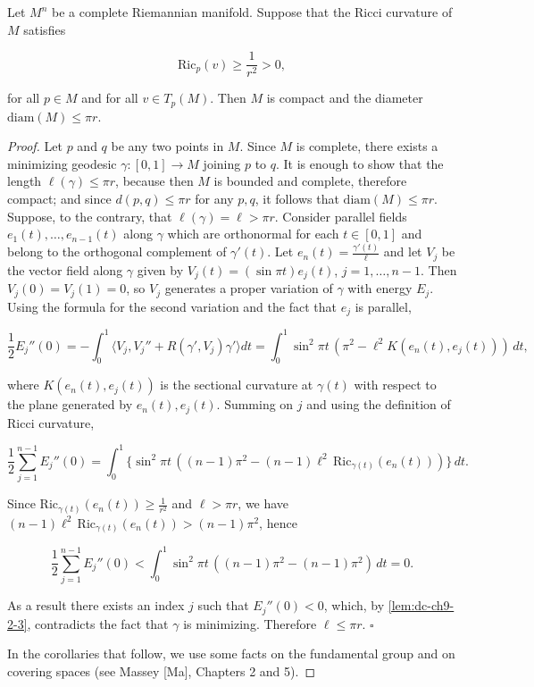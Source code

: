 \begin{theorem}
  \label{thm:dc-ch9-3-1}
  Let $M^n$ be a complete Riemannian manifold. Suppose that the Ricci curvature of
  $M$ satisfies
  
  $$
  \mathrm{Ric}_p(v)\ge\frac{1}{r^2}>0,
  $$
  
  for all $p\in M$ and for all $v\in T_p(M)$. Then $M$ is compact and the diameter
  $\mathrm{diam}(M)\le\pi r$.
\end{theorem}
\begin{proof}
  Let $p$ and $q$ be any two points in $M$. Since $M$ is complete, there
  exists a minimizing geodesic $\gamma:[0,1]\to M$ joining $p$ to $q$. It is enough
  to show that the length $\ell(\gamma)\le\pi r$, because then $M$ is bounded and
  complete, therefore compact; and since $d(p,q)\le\pi r$ for any $p,q$, it follows
  that $\mathrm{diam}(M)\le\pi r$. Suppose, to the contrary, that
  $\ell(\gamma)=\ell>\pi r$. Consider parallel fields $e_1(t),\dots,e_{n-1}(t)$ along
  $\gamma$ which are orthonormal for each $t\in[0,1]$ and belong to the orthogonal
  complement of $\gamma'(t)$. Let $e_n(t)=\frac{\gamma'(t)}{\ell}$ and let $V_j$ be
  the vector field along $\gamma$ given by $V_j(t)=(\sin\pi t)e_j(t)$,
  $j=1,\dots,n-1$. Then $V_j(0)=V_j(1)=0$, so $V_j$ generates a proper variation of
  $\gamma$ with energy $E_j$. Using the formula for the second variation and the fact
  that $e_j$ is parallel,
  
  $$
  \frac{1}{2}E_j''(0)=-\int_0^1\langle V_j,V_j''+R(\gamma',V_j)\gamma'\rangle dt=\int_0^1\sin^2\pi t\,(\pi^2-\ell^2 K(e_n(t),e_j(t)))\,dt,
  $$
  
  where $K(e_n(t),e_j(t))$ is the sectional curvature at $\gamma(t)$ with respect to
  the plane generated by $e_n(t),e_j(t)$. Summing on $j$ and using the definition of
  Ricci curvature,
  
  $$
  \frac{1}{2}\sum_{j=1}^{n-1}E_j''(0)=\int_0^1\{\sin^2\pi t\,((n-1)\pi^2-(n-1)\ell^2\,\mathrm{Ric}_{\gamma(t)}(e_n(t)))\}\,dt.
  $$
  
  Since $\mathrm{Ric}_{\gamma(t)}(e_n(t))\ge\frac{1}{r^2}$ and $\ell>\pi r$, we have
  $(n-1)\ell^2\,\mathrm{Ric}_{\gamma(t)}(e_n(t))>(n-1)\pi^2$, hence
  
  $$
  \frac{1}{2}\sum_{j=1}^{n-1}E_j''(0)<\int_0^1\sin^2\pi t\,((n-1)\pi^2-(n-1)\pi^2)\,dt=0.
  $$
  
  As a result there exists an index $j$ such that $E_j''(0)<0$, which, by \cref{lem:dc-ch9-2-3},
  contradicts the fact that $\gamma$ is minimizing. Therefore $\ell\le\pi r$.
  $\square$
  
  In the corollaries that follow, we use some facts on the fundamental group and on
  covering spaces (see Massey [Ma], Chapters 2 and 5).
\end{proof}

